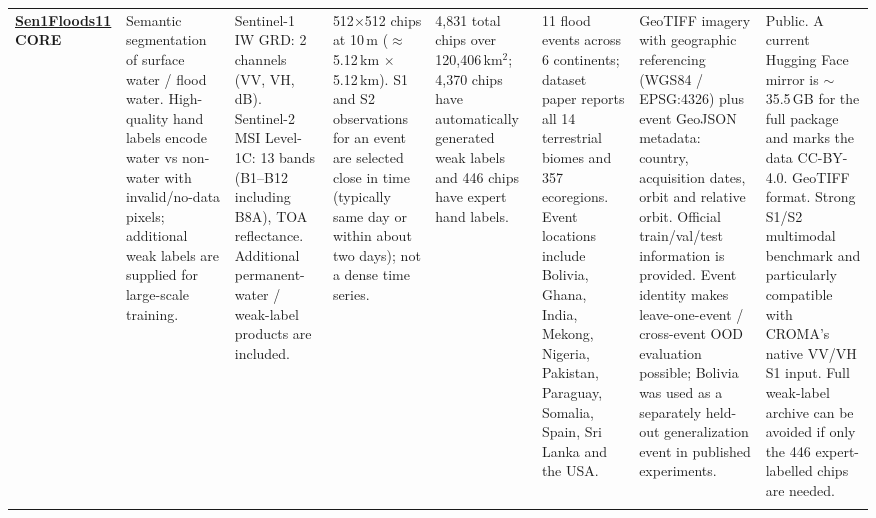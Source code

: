 \begin{landscape}
\begin{longtable}{
    Q{1.8cm}
    Q{2.5cm}
    Q{3.0cm}
    Q{2.5cm}
    Q{2.1cm}
    Q{3.0cm}
    Q{3.4cm}
    Q{3.4cm}
}
\href{https://github.com/cloudtostreet/Sen1Floods11}{\textbf{Sen1Floods11}}\newline
\textbf{CORE}
&
Semantic segmentation of surface water / flood water. High-quality hand labels encode water vs non-water with invalid/no-data pixels; additional weak labels are supplied for large-scale training.
&
Sentinel-1 IW GRD: 2 channels (VV, VH, dB). Sentinel-2 MSI Level-1C: 13 bands (B1--B12 including B8A), TOA reflectance. Additional permanent-water / weak-label products are included.
&
512$\times$512 chips at 10\,m ($\approx$5.12\,km $\times$ 5.12\,km). S1 and S2 observations for an event are selected close in time (typically same day or within about two days); not a dense time series.
&
4,831 total chips over 120,406\,km$^2$; 4,370 chips have automatically generated weak labels and 446 chips have expert hand labels.
&
11 flood events across 6 continents; dataset paper reports all 14 terrestrial biomes and 357 ecoregions. Event locations include Bolivia, Ghana, India, Mekong, Nigeria, Pakistan, Paraguay, Somalia, Spain, Sri Lanka and the USA.
&
GeoTIFF imagery with geographic referencing (WGS84 / EPSG:4326) plus event GeoJSON metadata: country, acquisition dates, orbit and relative orbit. Official train/val/test information is provided. Event identity makes leave-one-event / cross-event OOD evaluation possible; Bolivia was used as a separately held-out generalization event in published experiments.
&
Public. A current Hugging Face mirror is $\sim$35.5\,GB for the full package and marks the data CC-BY-4.0. GeoTIFF format. Strong S1/S2 multimodal benchmark and particularly compatible with CROMA's native VV/VH S1 input. Full weak-label archive can be avoided if only the 446 expert-labelled chips are needed.
\\
\addlinespace


\end{longtable}
\end{landscape}
